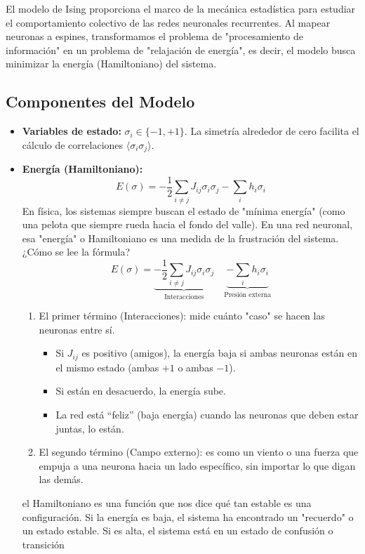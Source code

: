 El modelo de Ising proporciona el marco de la mecánica estadística para estudiar el comportamiento colectivo de las redes neuronales recurrentes. Al mapear neuronas a espines, transformamos el problema de "procesamiento de información" en un problema de "relajación de energía", es decir, el modelo busca minimizar la energía (Hamiltoniano) del sistema.

\subsection{Componentes del Modelo}
\begin{itemize}
    \item \textbf{Variables de estado:} $\sigma_i \in \{-1, +1\}$. La simetría alrededor de cero facilita el cálculo de correlaciones $\langle \sigma_i \sigma_j \rangle$.

    \item \textbf{Energía (Hamiltoniano):} 
    \begin{equation}
        E(\sigma) = -\frac{1}{2} \sum_{i \neq j} J_{ij} \sigma_i \sigma_j - \sum_i h_i \sigma_i
    \end{equation}
    En física, los sistemas siempre buscan el estado de "mínima energía" (como una pelota que siempre rueda hacia el fondo del valle). En una red neuronal, esa "energía" o Hamiltoniano es una medida de la frustración del sistema.¿Cómo se lee la fórmula?
    $$E(\sigma) = \underbrace{-\frac{1}{2} \sum_{i \neq j} J_{ij} \sigma_i \sigma_j}_{\text{Interacciones}} \quad \underbrace{- \sum_i h_i \sigma_i}_{\text{Presión externa}}$$
    
    \begin{enumerate}
        \item El primer término (Interacciones): mide cuánto "caso" se hacen las neuronas entre sí. \begin{itemize}
            \item Si $J_{ij}$ es positivo (amigos), la energía baja si ambas neuronas están en el mismo estado (ambas $+1$ o ambas $-1$).
            \item Si están en desacuerdo, la energía sube.
            \item La red está ``feliz'' (baja energía) cuando las neuronas que deben estar juntas, lo están.
        \end{itemize}
        \item El segundo término (Campo externo): es como un viento o una fuerza que empuja a una neurona hacia un lado específico, sin importar lo que digan las demás.
    \end{enumerate}
     el Hamiltoniano es una función que nos dice qué tan estable es una configuración. Si la energía es baja, el sistema ha encontrado un "recuerdo" o un estado estable. Si es alta, el sistema está en un estado de confusión o transición


\end{itemize}
